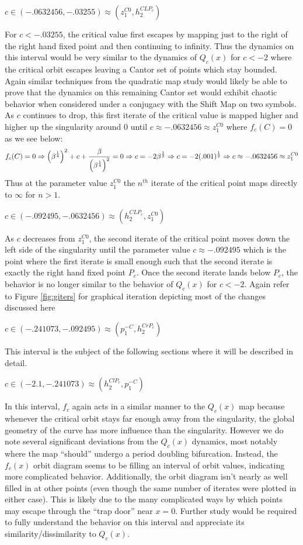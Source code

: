 	\underline{$c\in (-.0632456, -.03255) \approx (z_1^{C0}, h_2^{CLP_c})$}

	For $c < -.03255$, the critical value first escapes by mapping just to the right of the right hand fixed point and then continuing to infinity. Thus the dynamics on this interval would be very similar to the dynamics of $Q_c (x)$ for $c < -2$ where the critical orbit escapes leaving a Cantor set of points which stay bounded. Again similar techniques from the quadratic map study would likely be able to prove that the dynamics on this remaining Cantor set would exhibit chaotic behavior when considered under a conjugacy with the Shift Map on two symbols. As $c$ continues to drop, this first iterate of the critical value is mapped higher and higher up the singularity around 0 until $c \approx -.0632456 \approx z_1^{C0}$ where $f_c (C) = 0$ as we see below:
	\[
		f_c (C) = 0 \Rightarrow \left (\beta^{\frac{1}{4}}\right)^2 + c + \frac{\beta}{\left (\beta^{\frac{1}{4}}\right)^2} = 0 \Rightarrow c = -2 \beta^{\frac{1}{2}} \Rightarrow c = -2 (.001)^{\frac{1}{2}} \Rightarrow c \approx -.0632456 \approx z_1^{C0}
	\]
	Thus at the parameter value $z_1^{C0}$ the $n^{th}$ iterate of the critical point maps directly to $\infty$ for $n > 1$.

	\underline{$c\in (-.092495, -.0632456) \approx (h_2^{CLP_c}, z_1^{C0})$}

	As $c$ decreases from $z_1^{C0}$, the second iterate of the critical point moves down the left side of the singularity until the parameter value $c \approx -.092495$ which is the point where the first iterate is small enough such that the second iterate is exactly the right hand fixed point $P_c$. Once the second iterate lands below $P_c$, the behavior is no longer similar to the behavior of $Q_c (x)$ for $c < -2$. Again refer to Figure \ref{fig:giters} for graphical iteration depicting most of the changes discussed here

	\underline{$c\in (-.241073, -.092495) \approx (p_1^{-C}, h_2^{CrP_c})$}

	This interval is the subject of the following sections where it will be described in detail.

	\underline{$c \in (-2.1, -.241073) \approx (h_2^{ClP_c},p_1^{-C})$}

	In this interval, $f_c$ again acts in a similar manner to the $Q_c (x)$ map because whenever the critical orbit stays far enough away from the singularity, the global geometry of the curve has more influence than the singularity. However we do note several significant deviations from the $Q_c (x)$ dynamics, most notably where the map ``should'' undergo a period doubling bifurcation. Instead, the $f_c (x)$ orbit diagram seems to be filling an interval of orbit values, indicating more complicated behavior. Additionally, the orbit diagram isn't nearly as well filled in at other points (even though the same number of iterates were plotted in either case). This is likely due to the many complicated ways by which points may escape through the ``trap door'' near $x=0$. Further study would be required to fully understand the behavior on this interval and appreciate its similarity/dissimilarity to $Q_c (x)$.

